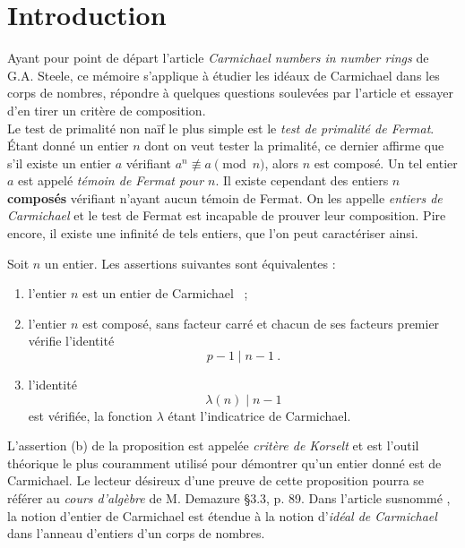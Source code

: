 \section*{Introduction}

Ayant pour point de départ l'article \textit{Carmichael numbers in number rings} \cite{article} de G.A. Steele, ce mémoire s'applique à étudier les idéaux de Carmichael dans les corps de nombres, répondre à quelques questions soulevées par l'article et essayer d'en tirer un critère de composition. \\

Le test de primalité non naïf le plus simple est le \emph{test de primalité de Fermat}. Étant donné un entier $n$ dont on veut tester la primalité, ce dernier affirme que s'il existe un entier $a$ vérifiant $a^n \not \equiv a \pmod{n}$, alors $n$ est composé. Un tel entier $a$ est appelé \emph{témoin de Fermat pour $n$}. Il existe cependant des entiers $n$ \textbf{composés} vérifiant n'ayant aucun témoin de Fermat. On les appelle \emph{entiers de Carmichael} et le test de Fermat est incapable de prouver leur composition. Pire encore, il existe une infinité de tels entiers, que l'on peut caractériser ainsi.

\begin{proposition}\label{korselt} Soit $n$ un entier. Les assertions suivantes sont équivalentes :
	\begin{enumerate}[font=\normalshape]
		\item l'entier $n$ est un entier de Carmichael ~;
		\item l'entier $n$ est composé, sans facteur carré et chacun de ses facteurs premier vérifie l'identité \[p-1 \mid n-1 ~.\]
		\item l'identité \[\lambda(n) \mid n-1\] est vérifiée, la fonction $\lambda$ étant l'indicatrice de Carmichael.
	\end{enumerate}
\end{proposition}

L'assertion (b) de la proposition est appelée \textit{critère de Korselt} et est l'outil théorique le plus couramment utilisé pour démontrer qu'un entier donné est de Carmichael. Le lecteur désireux d'une preuve de cette proposition pourra se référer au \textit{cours d'algèbre} de M. Demazure \cite{Demazure} §3.3, p. 89. Dans l'article susnommé \cite{article}, la notion d'entier de Carmichael est étendue à la notion d'\emph{idéal de Carmichael} dans l'anneau d'entiers d'un corps de nombres.

